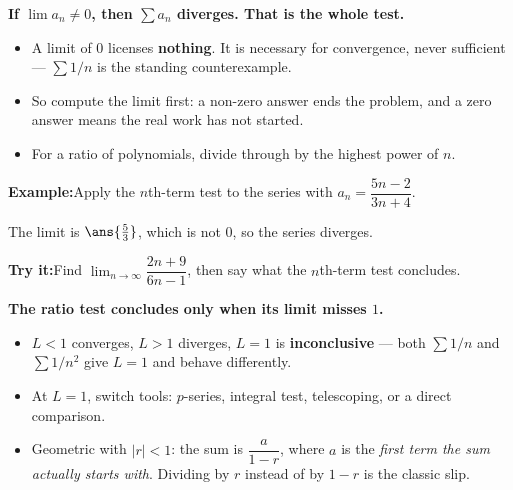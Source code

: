 \documentclass[12pt]{article}
\begin{document}


\begin{formulabox}
\textbf{If $\lim a_n \neq 0$, then $\sum a_n$ diverges. That is the whole test.}
\begin{itemize}[leftmargin=0.8cm, itemsep=1pt, topsep=2pt]
  \item A limit of $0$ licenses \textbf{nothing}. It is necessary for
        convergence, never sufficient --- $\sum 1/n$ is the standing
        counterexample.
  \item So compute the limit first: a non-zero answer ends the problem, and a
        zero answer means the real work has not started.
  \item For a ratio of polynomials, divide through by the highest power of $n$.
\end{itemize}
\end{formulabox}

\begin{examplebox}
\textbf{Example:}\quad Apply the $n$th-term test to the series with
$a_n = \dfrac{5n - 2}{3n + 4}$.



The limit is $\ans{\tfrac{5}{3}}$, which is not $0$, so the series diverges.
\end{examplebox}

\begin{tryitbox}
\textbf{Try it:}\quad Find $\displaystyle\lim_{n \to \infty}
\dfrac{2n + 9}{6n - 1}$, then say what the $n$th-term test concludes.

\end{tryitbox}


\begin{formulabox}
\textbf{The ratio test concludes only when its limit misses $1$.}
\begin{itemize}[leftmargin=0.8cm, itemsep=1pt, topsep=2pt]
  \item $L < 1$ converges, $L > 1$ diverges, $L = 1$ is \textbf{inconclusive} ---
        both $\sum 1/n$ and $\sum 1/n^{2}$ give $L = 1$ and behave differently.
  \item At $L = 1$, switch tools: $p$-series, integral test, telescoping, or a
        direct comparison.
  \item Geometric with $|r| < 1$: the sum is $\dfrac{a}{1 - r}$, where $a$ is the
        \emph{first term the sum actually starts with}. Dividing by $r$ instead
        of by $1 - r$ is the classic slip.
\end{itemize}
\end{formulabox}
\end{document}
